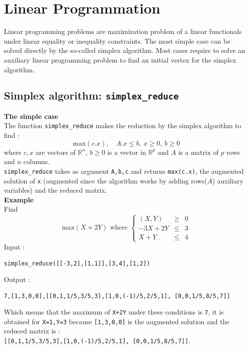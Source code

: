 \documentclass[a4paper,11pt]{book}
\begin{document}
\section{Linear Programmation}
Linear programming problems are maximization problem of a linear
functionals under linear equality or inequality constraints.
The most simple case can be solved directly by the so-called simplex
algorithm. Most cases require to solve an auxiliary linear
programming problem to find an initial vertex for the simplex
algorithm.

\subsection{Simplex algorithm: {\tt simplex\_reduce}}
{\bf The simple case}\\
The function {\tt simplex\_reduce} makes the reduction
by the simplex algorithm to find :
\[ \mbox{max}(c.x), \quad  A.x \leq b,\ x \geq 0,\ b\geq 0 \]
where $c,x$ are vectors of $\mathbb R^n$, $b\geq 0$ is a vector in
$\mathbb R^p$ and $A$ is a matrix of $p$ rows and $n$ columns.\\
{\tt simplex\_reduce} takes as argument {\tt A,b,c} and
returns  {\tt max(c.x)}, the augmented solution of {\tt x}
(augmented since the algorithm works by adding rows($A$) auxiliary
variables) and the reduced matrix.\\
{\bf Example}\\
Find \[ \mbox{max}(X+2Y)  \mbox{ where }
\left\{
\begin{array}{rcl}
(X,Y) & \geq & 0 \\
-3X +2Y  & \leq & 3\\
X +Y  & \leq & 4
\end{array}
\right.
\]
Input :
\begin{center}{\tt simplex\_reduce([[-3,2],[1,1]],[3,4],[1,2])}\end{center}
Output :
\begin{center}{\tt 7,[1,3,0,0],[[0,1,1/5,3/5,3],[1,0,(-1)/5,2/5,1], [0,0,1/5,8/5,7]]}\end{center}
Which means that the maximum of {\tt X+2Y} under these conditions
is {\tt 7}, it is obtained for {\tt X=1,Y=3}
because {\tt [1,3,0,0]} is the augmented solution and the reduced matrix is :\\
{\tt [[0,1,1/5,3/5,3],[1,0,(-1)/5,2/5,1], [0,0,1/5,8/5,7]]}.
\end{document}
